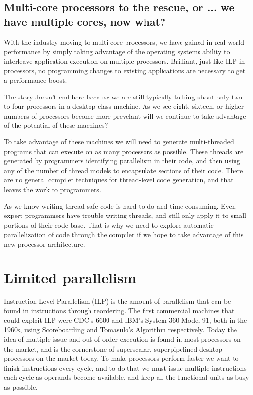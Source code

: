 \documentclass[12pt,twoside,letterpaper]{article}
\begin{document}
\subsection*{Multi-core processors to the rescue, or ... we have multiple cores, now what?}
With the industry moving to multi-core processors, we have gained in real-world performance by simply taking advantage of the operating systems ability to interleave application execution on multiple processors. Brilliant, just like ILP in processors, no programming changes to existing applications are necessary to get a performance boost.

The story doesn't end here because we are still typically talking about only two to four processors in a desktop class machine. As we see eight, sixteen, or higher numbers of processors become more prevelant will we continue to take advantage of the potential of these machines?

To take advantage of these machines we will need to generate multi-threaded programs that can execute on as many processors as possible. These threads are generated by programmers identifying parallelism in their code, and then using any of the number of thread models to encapsulate sections of their code. There are no general compiler techniques for thread-level code generation, and that leaves the work to programmers.

As we know writing thread-safe code is hard to do and time consuming. Even expert programmers have trouble writing threads, and still only apply it to small portions of their code base. That is why we need to explore automatic parallelization of code through the compiler if we hope to take advantage of this new processor architecture.

\section*{Limited parallelism}
Instruction-Level Parallelism (ILP) is the amount of parallelism that can be found in instructions through reordering. The first commercial machines that could exploit ILP were CDC’s 6600 and IBM’s System 360 Model 91, both in the 1960s, using Scoreboarding and Tomasulo’s Algorithm respectively. Today the idea of multiple issue and out-of-order execution is found in most processors on the market, and is the cornerstone of superscalar, superpipelined desktop processors on the market today. To make processors perform faster we want to finish instructions every cycle, and to do that we must issue multiple instructions each cycle as operands become available, and keep all the functional units as busy as possible.
\end{document}
